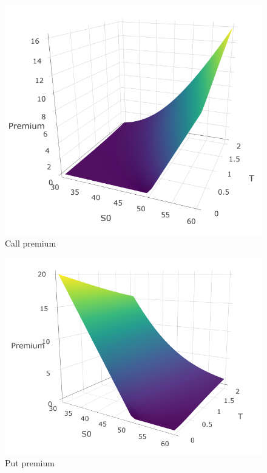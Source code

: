 \documentclass[hidelinks]{article}
\begin{document}
	
	\begin{figure}[!h]
	\centering
	\includegraphics[width=\textwidth]{premium_call.png}
    \caption{Call premium}
    \label{fig:call_prem}
    \end{figure}
    
    \newpage
    \begin{figure}[!h]
	\centering
	\includegraphics[width=\textwidth]{premium_put.png}
    \caption{Put premium}
    \label{fig:put_prem}
    \end{figure}
    
\end{document}
